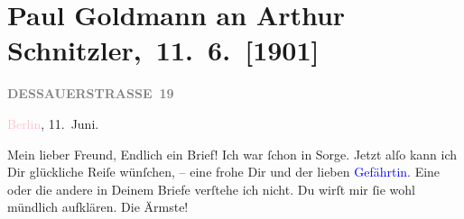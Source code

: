

\renewcommand{\erwaehntePersonen}{Personen:  Friedrich II. von Preußen, Marie Glümer, Hugo von Hofmannsthal, Gertrude von Hofmannsthal, Monty Jacobs, Dora Jacobs, Ulrich Levysohn, Olga Schnitzler, Paul-Charles-François de Thiébault, Dieudonné Thiébault}
\renewcommand{\erwaehnteInstitutionen}{Institutionen: Berliner Börsen-Courier, C. H. F. Hartmann}
\renewcommand{\erwaehnteOrte}{Orte: Berlin, Dessauer Straße, Leipzig, Salzburg, Südtirol, Tirol, Wörthersee}
\renewcommand{\erwaehnteWerke}{Werke: Berliner Börsen-Courier, Friedrich der Große, seine Familie, seine Freunde und sein Hof; oder Zwanzig Jahre meines Aufenthaltes in Berlin, 2 Bde., Lebendige Stunden. Vier Einakter, [Monty Jacobs über Arthur Schnitzler]}
\section[ Paul Goldmann an Arthur Schnitzler, 11. 6. {[}1901{]}]{Paul Goldmann an Arthur Schnitzler, 11. 6. {[}1901{]}}
\nopagebreak{}
\rehead{ }\normalsize\beginnumbering{}
\toendnotes[C]{\smallbreak\pagebreak[2]}
\toendnotes[C]{\smallbreak}
\pstart
           \noindent{}\raggedleft{}{\pb}\textcolor{pink}{\textcolor{gray}{\textbf{DESSAUERSTRASSE 19}}}{}\ledrightnote{\textcolor{pink}{Dessauer Straße}}\pend
           
\pstart
           \textcolor{pink}{Berlin}{}\ledrightnote{\textcolor{pink}{Berlin}}, 11. Juni.\pend
           
\pstart\center{}Mein lieber Freund,\pend
\pstart
           Endlich ein Brief! Ich war ſchon in Sorge. Jetzt alſo kann ich Dir glückliche Reiſe
               wünſchen, – eine frohe \label{K_L03069-3v}\label{K_L03069-3h} Dir und der lieben \textcolor{blue}{Gefährtin}{}\ledrightnote{{$\rightarrow$}\textcolor{blue}{Olga Schnitzler}}. Eine oder die andere \label{K_L03069-2v}\label{K_L03069-2h} in Deinem Briefe verſtehe ich nicht. Du wirſt mir ſie wohl mündlich
               aufklären. \label{K_L03069-1v}\label{K_L03069-1h} Die
               Ärmste!\pend
           
